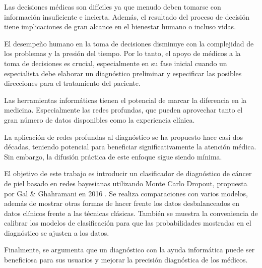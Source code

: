 \begin{abstracts}

Las decisiones médicas son difíciles ya que menudo deben tomarse con información insuficiente e incierta. Además, el resultado del proceso de decisión tiene implicaciones de gran alcance en el bienestar humano o incluso vidas. 

El desempeño humano en la toma de decisiones disminuye con la complejidad de los problemas y la presión del tiempo. Por lo tanto, el apoyo de médicos a la toma de decisiones es crucial, especialmente en su fase inicial cuando un especialista debe elaborar un diagnóstico preliminar y especificar las posibles direcciones para el tratamiento del paciente.

Las herramientas informáticas tienen el potencial de marcar la diferencia en la medicina. Especialmente las redes profundas, que pueden aprovechar tanto el gran número de datos disponibles como la experiencia clínica.

La aplicación de redes profundas al diagnóstico se ha propuesto hace casi dos décadas, teniendo potencial para beneficiar significativamente la atención médica. Sin embargo, la difusión práctica de este enfoque sigue siendo mínima.

El objetivo de este trabajo es introducir un clasificador de diagnóstico de cáncer de piel basado en redes bayesianas utilizando Monte Carlo Dropout, propuesta por Gal \& Ghahramani en 2016 \cite{bayesian_networks-gal}. Se realiza comparaciones con varios modelos, además de mostrar otras formas de hacer frente los datos desbalanceados en datos clínicos frente a las técnicas clásicas. También se muestra la conveniencia de calibrar los modelos de clasificación para que las probabilidades mostradas en el diagnóstico se ajusten a los datos.

Finalmente, se argumenta que un diagnóstico con la ayuda informática puede ser beneficiosa para sus usuarios y mejorar la precisión diagnóstica de los médicos.

\end{abstracts}

